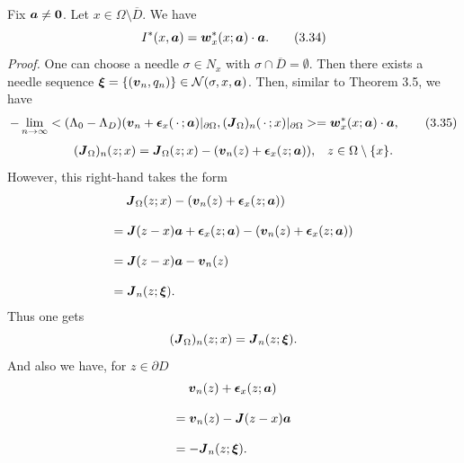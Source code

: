   
  Fix $\mbox{\boldmath $a$}\not=\mbox{\boldmath $0$}$.
Let $x\in\Omega\setminus\overline{D}$.
We have
$$\displaystyle
I^*(x,\mbox{\boldmath $a$})=\mbox{\boldmath $w$}_x^*(x;\mbox{\boldmath $a$})\cdot\mbox{\boldmath $a$}.
\tag {3.34}
$$
\endproclaim
{\it\noindent Proof.}
One can choose a needle $\sigma\in N_x$ with $\sigma\cap\overline{D}=\emptyset$.
Then there exists a needle sequence $\mbox{\boldmath $\xi$}=\{(\mbox{\boldmath $v$}_n,q_n)\}\in{\cal N}(\sigma,x,\mbox{\boldmath $a$})$.
Then, similar to Theorem 3.5, we have
$$\displaystyle
-\lim_{n\rightarrow\infty}
<(\Lambda_0-\Lambda_D)(\mbox{\boldmath $v$}_n
+\mbox{\boldmath $\epsilon$}_x(\,\cdot\,;\mbox{\boldmath $a$})\vert_{\partial\Omega},
(\mbox{\boldmath $J$}_{\Omega})_n(\,\cdot\,;x)\vert_{\partial\Omega}>
=\mbox{\boldmath $w$}_x^*(x;\mbox{\boldmath $a$})\cdot\mbox{\boldmath $a$},
\tag {3.35}
$$
$$\begin{array}{ll}
\displaystyle
(\mbox{\boldmath $J$}_{\Omega})_n(z;x)
=\mbox{\boldmath $J$}_{\Omega}(z;x)
-(\mbox{\boldmath $v$}_n(z)+\mbox{\boldmath $\epsilon$}_x(z;\mbox{\boldmath $a$})),
& z\in\Omega\setminus\{x\}.
\end{array}
$$
However, this right-hand takes the form
$$\begin{array}{l}
\displaystyle
\,\,\,\,\,\,
\mbox{\boldmath $J$}_{\Omega}(z;x)
-(\mbox{\boldmath $v$}_n(z)+\mbox{\boldmath $\epsilon$}_x(z;\mbox{\boldmath $a$}))
\\
\\
\displaystyle
=\mbox{\boldmath $J$}(z-x)\mbox{\boldmath $a$}+\mbox{\boldmath $\epsilon$}_x(z;\mbox{\boldmath $a$})
-(\mbox{\boldmath $v$}_n(z)+\mbox{\boldmath $\epsilon$}_x(z;\mbox{\boldmath $a$}))
\\
\\
\displaystyle
=\mbox{\boldmath $J$}(z-x)\mbox{\boldmath $a$}-\mbox{\boldmath $v$}_n(z)
\\
\\
\displaystyle
=\mbox{\boldmath $J$}_n(z;\mbox{\boldmath $\xi$}).
\end{array}
$$
Thus one gets
$$\displaystyle
(\mbox{\boldmath $J$}_{\Omega})_n(z;x)=\mbox{\boldmath $J$}_n(z;\mbox{\boldmath $\xi$}).
$$
And also we have, for $z\in\partial D$
$$\begin{array}{l}
\displaystyle
\,\,\,\,\,\,
\mbox{\boldmath $v$}_n(z)+\mbox{\boldmath $\epsilon$}_x(z;\mbox{\boldmath $a$})
\\
\\
\displaystyle
=\mbox{\boldmath $v$}_n(z)-\mbox{\boldmath $J$}(z-x)\mbox{\boldmath $a$}\\
\\
\displaystyle
=-\mbox{\boldmath $J$}_n(z;\mbox{\boldmath $\xi$}).
\end{array}
$$
